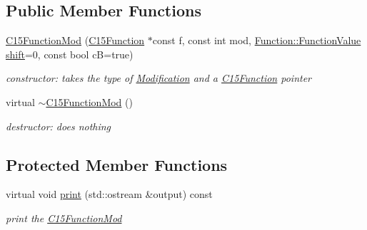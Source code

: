 \subsection*{Public Member Functions}
\begin{DoxyCompactItemize}
\item 
\mbox{\hyperlink{class_s_m_spp__di__unipi__it_1_1_c15_function_mod_a602d9b4f2118ac9630069a11808fadbe}{C15\+Function\+Mod}} (\mbox{\hyperlink{class_s_m_spp__di__unipi__it_1_1_c15_function}{C15\+Function}} $\ast$const f, const int mod, \mbox{\hyperlink{class_s_m_spp__di__unipi__it_1_1_function_a9ad432406b609e28d340f73e9474bffe}{Function\+::\+Function\+Value}} \mbox{\hyperlink{class_s_m_spp__di__unipi__it_1_1_function_mod_a177a0111cf0d0fdc5409df06c3b5e282}{shift}}=0, const bool cB=true)
\begin{DoxyCompactList}\small\item\em constructor\+: takes the type of \mbox{\hyperlink{class_s_m_spp__di__unipi__it_1_1_modification}{Modification}} and a \mbox{\hyperlink{class_s_m_spp__di__unipi__it_1_1_c15_function}{C15\+Function}} pointer \end{DoxyCompactList}\item 
\mbox{\label{class_s_m_spp__di__unipi__it_1_1_c15_function_mod_a2e73ee5b070a06cd8616a15a888d0c69}} 
virtual \mbox{\hyperlink{class_s_m_spp__di__unipi__it_1_1_c15_function_mod_a2e73ee5b070a06cd8616a15a888d0c69}{$\sim$\+C15\+Function\+Mod}} ()
\begin{DoxyCompactList}\small\item\em destructor\+: does nothing \end{DoxyCompactList}\end{DoxyCompactItemize}
\subsection*{Protected Member Functions}
\begin{DoxyCompactItemize}
\item 
\mbox{\label{class_s_m_spp__di__unipi__it_1_1_c15_function_mod_a2e7b9c9148a98c5c342e8c25cac95926}} 
virtual void \mbox{\hyperlink{class_s_m_spp__di__unipi__it_1_1_c15_function_mod_a2e7b9c9148a98c5c342e8c25cac95926}{print}} (std\+::ostream \&output) const
\begin{DoxyCompactList}\small\item\em print the \mbox{\hyperlink{class_s_m_spp__di__unipi__it_1_1_c15_function_mod}{C15\+Function\+Mod}} \end{DoxyCompactList}\end{DoxyCompactItemize}
